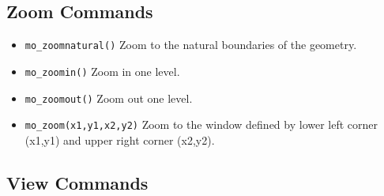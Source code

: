 \subsection{Zoom Commands}
\begin{itemize}
\item{\verb+mo_zoomnatural()+} Zoom to the natural boundaries of
the geometry.
\item{\verb+mo_zoomin()+} Zoom in one level.
\item{\verb+mo_zoomout()+} Zoom out one level.
\item{\tt mo\_zoom(x1,y1,x2,y2)} Zoom to the window defined by lower left corner (x1,y1)
and upper right corner (x2,y2).

\end{itemize}

\subsection{View Commands}
